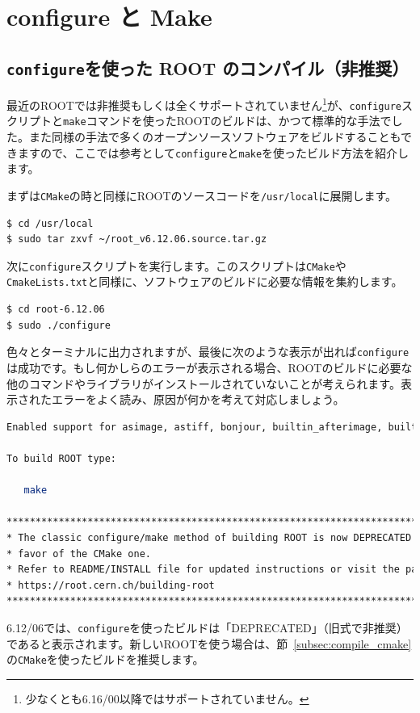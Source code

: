 \chapter{configure と Make}
\label{chap:configure}

\section{\texttt{configure}を使った ROOT のコンパイル（非推奨）}
\label{sec:compile_configure}

最近のROOTでは非推奨もしくは全くサポートされていません\footnote{少なくとも6.16/00以降ではサポートされていません。}が、\texttt{configure}スクリプトと\texttt{make}コマンドを使ったROOTのビルドは、かつて標準的な手法でした。また同様の手法で多くのオープンソースソフトウェアをビルドすることもできますので、ここでは参考として\texttt{configure}と\texttt{make}を使ったビルド方法を紹介します。

まずは\texttt{CMake}の時と同様にROOTのソースコードを\texttt{/usr/local}に展開します。
\begin{lstlisting}[language=bash]
$ cd /usr/local
$ sudo tar zxvf ~/root_v6.12.06.source.tar.gz
\end{lstlisting}

次に\texttt{configure}スクリプトを実行します。このスクリプトは\texttt{CMake}や\texttt{CmakeLists.txt}と同様に、ソフトウェアのビルドに必要な情報を集約します。

\begin{lstlisting}[language=bash]
$ cd root-6.12.06
$ sudo ./configure
\end{lstlisting}

色々とターミナルに出力されますが、最後に次のような表示が出れば\texttt{configure}は成功です。もし何かしらのエラーが表示される場合、ROOTのビルドに必要な他のコマンドやライブラリがインストールされていないことが考えられます。表示されたエラーをよく読み、原因が何かを考えて対応しましょう。
\begin{lstlisting}[language=bash]
Enabled support for asimage, astiff, bonjour, builtin_afterimage, builtin_ftgl, builtin_freetype, builtin_gl2ps, builtin_glew, builtin_unuran, builtin_lz4, builtin_llvm, libcxx, cocoa, explicitlink, fink, fitsio, gviz, genvector, krb5, ldap, memstat, opengl, python, rpath, search_usrlocal, shared, sqlite, tmva, xml.

To build ROOT type:

   make 

******************************************************************************
* The classic configure/make method of building ROOT is now DEPRECATED in    *
* favor of the CMake one.                                                    *
* Refer to README/INSTALL file for updated instructions or visit the page    *
* https://root.cern.ch/building-root                                         *
******************************************************************************
\end{lstlisting}
6.12/06では、\texttt{configure}を使ったビルドは「DEPRECATED」（旧式で非推奨）であると表示されます。新しいROOTを使う場合は、節~\ref{subsec:compile_cmake}の\texttt{CMake}を使ったビルドを推奨します。

